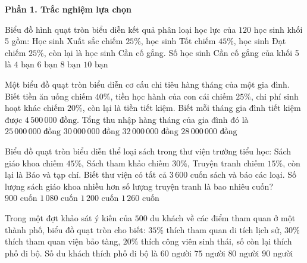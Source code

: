 \textbf{Phần 1. Trắc nghiệm lựa chọn}

\begin{ex} %
Biểu đồ hình quạt tròn biểu diễn kết quả phân loại học lực của $120$ học sinh khối 5 gồm: Học sinh Xuất sắc chiếm $25\%$, học sinh Tốt chiếm $45\%$, học sinh Đạt chiếm $25\%$, còn lại là học sinh Cần cố gắng. Số học sinh Cần cố gắng của khối 5 là
\choice
{$4\text{ bạn}$}
{\True $6\text{ bạn}$}
{$8\text{ bạn}$}
{$10\text{ bạn}$}
\end{ex}

\begin{ex} %
Một biểu đồ quạt tròn biểu diễn cơ cấu chi tiêu hàng tháng của một gia đình. Biết tiền ăn uống chiếm $40\%$, tiền học hành của con cái chiếm $25\%$, chi phí sinh hoạt khác chiếm $20\%$, còn lại là tiền tiết kiệm. Biết mỗi tháng gia đình tiết kiệm được $4\,500\,000\text{ đồng}$. Tổng thu nhập hàng tháng của gia đình đó là
\choice
{$25\,000\,000\text{ đồng}$}
{\True $30\,000\,000\text{ đồng}$}
{$32\,000\,000\text{ đồng}$}
{$28\,000\,000\text{ đồng}$}
\end{ex}

\begin{ex} %
Biểu đồ quạt tròn biểu diễn thể loại sách trong thư viện trường tiểu học: Sách giáo khoa chiếm $45\%$, Sách tham khảo chiếm $30\%$, Truyện tranh chiếm $15\%$, còn lại là Báo và tạp chí. Biết thư viện có tất cả $3\,600$ cuốn sách và báo các loại. Số lượng sách giáo khoa nhiều hơn số lượng truyện tranh là bao nhiêu cuốn?
\choice
{$900\text{ cuốn}$}
{\True $1\,080\text{ cuốn}$}
{$1\,200\text{ cuốn}$}
{$1\,260\text{ cuốn}$}
\end{ex}

\begin{ex} %
Trong một đợt khảo sát ý kiến của $500$ du khách về các điểm tham quan ở một thành phố, biểu đồ quạt tròn cho biết: $35\%$ thích tham quan di tích lịch sử, $30\%$ thích tham quan viện bảo tàng, $20\%$ thích công viên sinh thái, số còn lại thích phố đi bộ. Số du khách thích phố đi bộ là
\choice
{$60\text{ người}$}
{\True $75\text{ người}$}
{$80\text{ người}$}
{$90\text{ người}$}
\end{ex}


